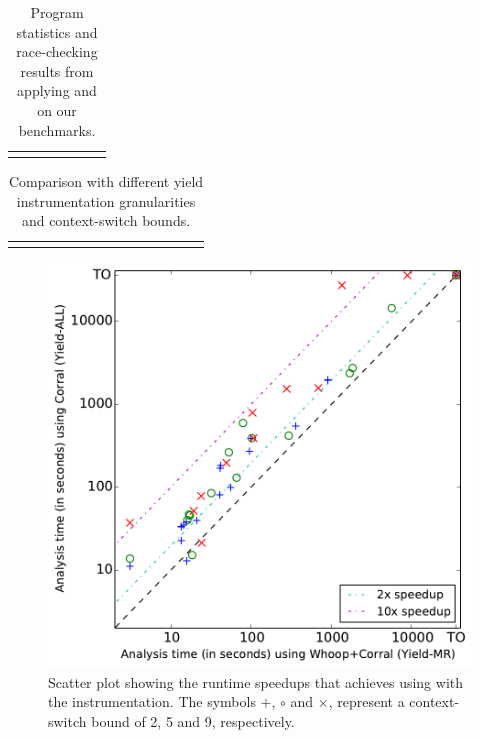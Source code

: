 \newcommand{\colspacing}{\hspace{1.8em}}
\begin{table}[t]
\small
\centering
\setlength{\tabcolsep}{0.3em}
\caption{Program statistics and race-checking results from applying \whoop and \corral on our benchmarks.}
\label{tab:stats}
\begin{tabular}{l rrr rr r}
\centering

\end{tabular}
\end{table}

\begin{table}[t]
\small
\centering
\setlength{\tabcolsep}{0.45em}
\caption{Comparison with different yield instrumentation granularities and context-switch bounds.}
\label{tab:results}
\begin{tabular}{l r rrrr rrrr rrrr}
\centering

\end{tabular}
\end{table}

\begin{figure}
\centering
\includegraphics[width=.99\linewidth]{experiments/figures/yieldmr_vs_yieldall.pdf}
\caption{Scatter plot showing the runtime speedups that \corral achieves using \whoop with the \yieldmr instrumentation. The symbols $+$, $\circ$ and $\times$, represent a context-switch bound of 2, 5 and 9, respectively.}
\label{fig:plot}
\end{figure}

